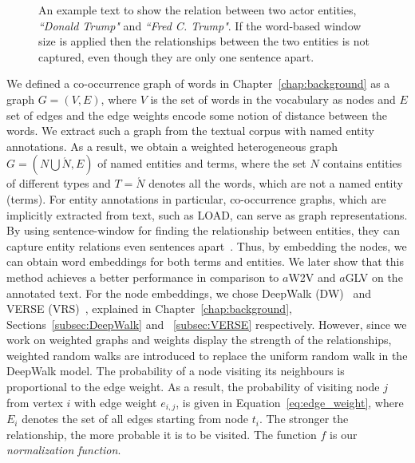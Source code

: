 \begin{figure}
\centering 
\resizebox{0.90\textwidth}{0.2\textwidth}{      

}
\caption{An example text to show the relation between two actor entities, \emph{``Donald Trump"} and \emph{``Fred C. Trump"}. If the word-based window size is applied then the relationships between the two entities is not captured, even though they are only one sentence apart.}
\label{fig:article_entities}
\end{figure}
\noindent
We defined a co-occurrence graph of words in Chapter~\ref{chap:background} as a graph $G=(V,E)$, where $V$ is the set of words in the vocabulary as nodes and $E$ set of edges and the edge weights encode some notion of distance between the words. We extract such a graph from the textual corpus with named entity annotations. As a result, we obtain a weighted heterogeneous graph $G=(N\bigcup  \acute {N},E)$ of named entities and terms, where the set $N$ contains entities of different types and $ T=\acute {N }$ denotes all the words, which are not a named entity (terms). For entity annotations in particular, co-occurrence graphs, which are implicitly extracted from text, such as LOAD, can serve as graph representations. By using sentence-window for finding the relationship between entities, they can capture entity relations even sentences apart~. Thus, by embedding the nodes, we can obtain word embeddings for both terms and entities. We later show that this method achieves a better performance in comparison to $a$W2V and $a$GLV on the annotated text. For the node embeddings, we chose DeepWalk (DW)~ and VERSE (VRS)~, explained in Chapter~\ref{chap:background}, Sections~\ref{subsec:DeepWalk} and ~\ref{subsec:VERSE} respectively. However, since we work on weighted graphs and weights display the strength of the relationships, weighted random walks are introduced to replace the uniform random walk in the DeepWalk model. The probability of a node visiting its neighbours is proportional to the edge weight. As a result, the probability of visiting node $j$ from vertex $i$ with edge weight $e_{i,j}$,  is given in Equation~\ref{eq:edge_weight}, where $ E_{ i }$ denotes the set of all edges starting from node $t_{i}$. The stronger the relationship, the more probable it is to be visited. The function $f$ is our \emph{normalization function}. 


